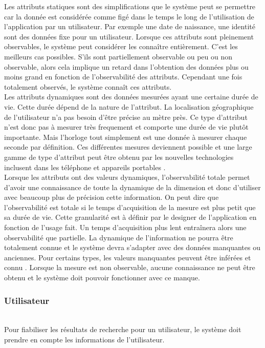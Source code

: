 \documentclass[conference]{./sty/IEEEtran}
\begin{document}
Les attributs statiques sont des simplifications que le système peut se
permettre car la donnée est considérée comme figé dans le temps le long de
l'utilisation de l'application par un utilisateur. Par exemple une date de
naissance, une identité sont des données fixe pour un utilisateur. Lorsque ces
attributs sont pleinement observables, le système peut considérer les connaître
entièrement. C'est les meilleurs cas possibles. S'ils sont partiellement
observable ou peu ou non observable, alors cela implique un retard dans
l'obtention des données plus ou moins grand en fonction de l'observabilité des
attributs. Cependant une fois totalement observés, le système connaît ces
attributs. \\

Les attributs dynamiques sont des données mesurées ayant une certaine durée de
vie. Cette durée dépend de la nature de l'attribut. La localisation
géographique de l'utilisateur n'a pas besoin d'être précise au mètre près. Ce
type d'attribut n'est donc pas à mesurer très frequement et comporte une durée
de vie plutôt importante. Mais l'horloge tout simplement est une donnée à
mesurer chaque seconde par définition. Ces différentes mesures deviennent
possible et une large gamme de type d'attribut peut être obtenu par les
nouvelles technologies inclusent dans les téléphone et appareils portables
\cite{DBLP:conf/wstst/Kurti08}. \\

Lorsque les attributs ont des valeurs dynamiques, l'observabilité totale permet
d'avoir une connaissance de toute la dynamique de la dimension et donc
d'utiliser avec beaucoup plus de précision cette information. On peut dire que
l'observabilité est totale si le temps d'acquisition de la mesure est plus
petit que sa durée de vie. Cette granularité est à définir par le designer de
l'application en fonction de l'usage fait. Un temps d'acquisition plus lent
entraînera alors une observabilité que partielle. La dynamique de l'information
ne pourra être totalement connue et le système devra s'adapter avec des données
manquantes ou anciennes. Pour certains types, les valeurs manquantes peuvent
être inférées et connu \cite{DBLP:journals/prl/TruccoFR99}. Lorsque la mesure
est non observable, aucune connaissance ne peut être obtenu et le système doit
pouvoir fonctionner avec ce manque. \\

\subsubsection{Utilisateur}
~\\
Pour fiabiliser les résultats de recherche pour un utilisateur, le système doit
prendre en compte les informations de l'utilisateur. \\
\end{document}
